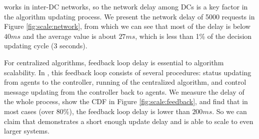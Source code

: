  \name works in inter-DC networks, so the network delay among DCs is a key factor in the algorithm updating process. We present the network delay of 5000 requests in Figure \ref{fig:scale:network}, from which we can see that most of the delay is below $40ms$ and the average value is about $27ms$, which is less than 1\% of the decision updating cycle (3 seconds).

 For centralized algorithms, feedback loop delay is essential to algorithm scalability. In \name, this feedback loop consists of several procedures: status updating from agents to the controller, running of the centralized algorithm, and control message updating from the controller back to agents. We measure the delay of the whole process, show the CDF in Figure \ref{fig:scale:feedback}, and find that in most cases (over 80\%), the feedback loop delay is lower than $200ms$. So we can claim that \name demonstrates a short enough update delay and is able to scale to even larger systems.

